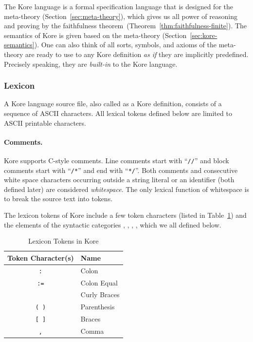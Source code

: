 \documentclass[UTF8,11pt]{article}
\theoremstyle{plain}
\theoremstyle{definition}
\theoremstyle{remark}
\newcommand{\syntacc}[1]{\text{$\langle$\textit{#1}$\rangle$}}
\begin{document}
The Kore language is a formal specification language that is designed for the
meta-theory (Section~\ref{sec:meta-theory}), which gives us all power of
reasoning and proving by the faithfulness
theorem~(Theorem~\ref{thm:faithfulness-finite}).
The semantics of Kore is given based on the meta-theory
(Section~\ref{sec:kore-semantics}).
One can also think of all sorts, symbols, and axioms of the meta-theory are
ready to use to any Kore definition \emph{as if} they are implicitly predefined.
Precisely speaking, they are \emph{built-in} to the Kore language.

\subsubsection{Lexicon}


A Kore language source file, also called as a Kore definition, consists of a
sequence of ASCII characters.
All lexical tokens defined below are limited to ASCII printable characters.

\paragraph{Comments.}
Kore supports C-style comments.
Line comments start with ``\verb|//|'' and block comments start with
``\verb|/*|'' and end with ``\verb|*/|''.
Both comments and consecutive white space characters occurring outside a string
literal or an identifier (both defined later) are considered \emph{whitespace}.
The only lexical function of whitespace is to break the source text into tokens.

The lexicon tokens of Kore include a few token characters (listed in
Table~\ref{tab:lexicon-tokens}) and the elements of the syntactic categories
\syntacc{identifier},
\syntacc{char},
\syntacc{string},
\syntacc{keyword}, which we all defined below.

\begin{table}[h]
 \centering
 \begin{tabular}{c|l}
  \textrm{Token Character(s)} & \textrm{Name} %
  \\\hline
  \texttt{:} & Colon %
  \\
  \texttt{:=} & Colon Equal %
  \\
  \texttt{\string{ \string}} & Curly Braces %
  \\
  \texttt{( )} & Parenthesis %
  \\
  \texttt{[ ]} & Braces
  \\
  \texttt{,} & Comma %
 \end{tabular}
 \caption{Lexicon Tokens in Kore}
 \label{tab:lexicon-tokens}
\end{table}
\end{document}
